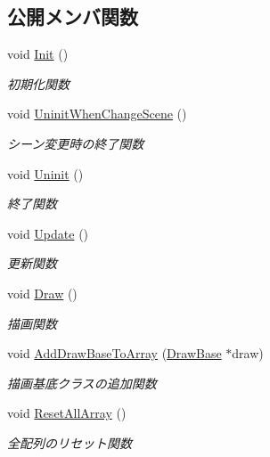 \subsection*{公開メンバ関数}
\begin{DoxyCompactItemize}
\item 
void \mbox{\hyperlink{class_back_buffer_a65ac0a652db2a558ecda120ef3f47a10}{Init}} ()
\begin{DoxyCompactList}\small\item\em 初期化関数 \end{DoxyCompactList}\item 
void \mbox{\hyperlink{class_back_buffer_a989c5474cabde7f88c197a2a235e8424}{Uninit\+When\+Change\+Scene}} ()
\begin{DoxyCompactList}\small\item\em シーン変更時の終了関数 \end{DoxyCompactList}\item 
void \mbox{\hyperlink{class_back_buffer_a18f0eebb58ad22bc0514edddf966eea7}{Uninit}} ()
\begin{DoxyCompactList}\small\item\em 終了関数 \end{DoxyCompactList}\item 
void \mbox{\hyperlink{class_back_buffer_a11c7fa5da3d892c72bf6d44e7b269c62}{Update}} ()
\begin{DoxyCompactList}\small\item\em 更新関数 \end{DoxyCompactList}\item 
void \mbox{\hyperlink{class_back_buffer_adb51191c002489e4faac54199449e9ef}{Draw}} ()
\begin{DoxyCompactList}\small\item\em 描画関数 \end{DoxyCompactList}\item 
void \mbox{\hyperlink{class_back_buffer_ab9cae17a69086b467f6e016e432b224b}{Add\+Draw\+Base\+To\+Array}} (\mbox{\hyperlink{class_draw_base}{Draw\+Base}} $\ast$draw)
\begin{DoxyCompactList}\small\item\em 描画基底クラスの追加関数 \end{DoxyCompactList}\item 
void \mbox{\hyperlink{class_back_buffer_a04e942576ac5de94d16764d347111234}{Reset\+All\+Array}} ()
\begin{DoxyCompactList}\small\item\em 全配列のリセット関数 \end{DoxyCompactList}\item 

\end{DoxyCompactItemize}
